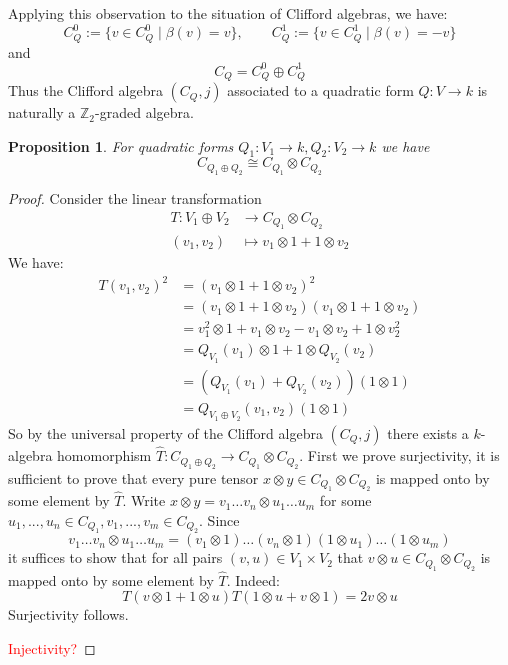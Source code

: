 \documentclass[12pt]{article}
\theoremstyle{plain}
\newtheorem{proposition}[thm]{Proposition}
\theoremstyle{definition}
\newcommand{\bb}[1]{\mathbb{#1}}
\newcommand{\lto}{\longrightarrow}
\begin{document}
Applying this observation to the situation of Clifford algebras, we have:
\begin{equation}
C_Q^0 := \lbrace v \in C_Q^0 \mid \beta(v) = v\rbrace, \qquad C_Q^1 := \lbrace v \in C_Q^1 \mid \beta(v) = -v\rbrace
\end{equation}
and
\begin{equation}
C_Q = C_Q^0 \oplus C_Q^1
\end{equation}
Thus the Clifford algebra $(C_Q,j)$ associated to a quadratic form $Q: V \lto k$ is naturally a $\bb{Z}_2$-graded algebra.
\begin{proposition}\label{prop:sum_tensor}
For quadratic forms $Q_1: V_1 \lto k, Q_2: V_2 \lto k$ we have
\begin{equation}
C_{Q_1 \oplus Q_2} \cong C_{Q_1} \otimes C_{Q_2}
\end{equation}
\end{proposition}
\begin{proof}
Consider the linear transformation
\begin{align*}
T: V_1 \oplus V_2 &\lto C_{Q_1} \otimes C_{Q_2}\\
(v_1,v_2) &\longmapsto v_1 \otimes 1 + 1 \otimes v_2
\end{align*}
We have:
\begin{align*}
T(v_1,v_2)^2 &= (v_1 \otimes 1 + 1 \otimes v_2)^2\\
&= (v_1 \otimes 1 + 1 \otimes v_2)(v_1 \otimes 1 + 1 \otimes v_2)\\
&= v_1^2 \otimes 1 + v_1 \otimes v_2 - v_1 \otimes v_2 + 1 \otimes v_2^2\\
&= Q_{V_1}(v_1) \otimes 1 + 1 \otimes Q_{V_2}(v_2)\\
&= (Q_{V_1}(v_1) + Q_{V_2}(v_2))(1 \otimes 1)\\
&= Q_{V_1 \oplus V_2}(v_1,v_2)(1 \otimes 1)
\end{align*}
So by the universal property of the Clifford algebra $(C_Q,j)$ there exists a $k$-algebra homomorphism $\hat{T}: C_{Q_1 \oplus Q_2} \lto C_{Q_1} \otimes C_{Q_2}$. First we prove surjectivity, it is sufficient to prove that every pure tensor $x \otimes y \in C_{Q_1} \otimes C_{Q_2}$ is mapped onto by some element by $\hat{T}$. Write $x \otimes y = v_1\hdots v_n \otimes u_1 \hdots u_m$ for some $u_1,...,u_n \in C_{Q_1}, v_1,...,v_m \in C_{Q_2}$. Since
\begin{equation}
v_1\hdots v_n \otimes u_1 \hdots u_m = (v_1 \otimes 1)\hdots(v_n \otimes 1)(1 \otimes u_1)\hdots (1 \otimes u_m)
\end{equation}
it suffices to show that for all pairs $(v,u) \in V_1 \times V_2$ that $v \otimes u \in C_{Q_1} \otimes C_{Q_2}$ is mapped onto by some element by $\hat{T}$. Indeed:
\begin{equation}
T(v \otimes 1 + 1 \otimes u)T(1 \otimes u + v \otimes 1) = 2v\otimes u
\end{equation}
Surjectivity follows.

\textcolor{red}{Injectivity?}
\end{proof}
\end{document}
